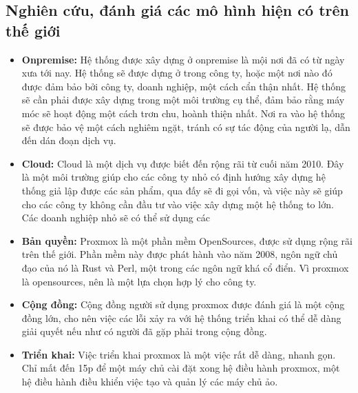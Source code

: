 \documentclass[12pt,a4paper]{report}
\begin{document}
		\subsection{Nghiên cứu, đánh giá các mô hình hiện có trên thế giới}
			\hspace{1.0cm}{Hiện nay, mô hình máy chủ trên thế giới rất phổ biến và được áp dụng vào rất nhiều các doanh nghiệp lớn và nhỏ. Tuỳ thuộc vào nhu cầu, định hướng của công ty, thì số vốn đầu tư bỏ ra vào máy chủ sẽ là khác nhau.}
			
			\hspace{0.3cm}{Hiện nay, mô hình hiện có sẽ được triển khai ở 2 nơi: }
				\begin{itemize}
					\item {\textbf{Onpremise: } Hệ thống được xây dựng ở onpremise là mội nơi đã có từ ngày xưa tới nay. Hệ thống sẽ được dựng ở trong công ty, hoặc một nơi nào đó được đảm bảo bởi công ty, doanh nghiệp, một cách cẩn thận nhất. Hệ thống sẽ cần phải được xây dựng trong một môi trường cụ thể, đảm bảo rằng máy móc sẽ hoạt động một cách trơn chu, hoành thiện nhất. Nơi ra vào hệ thống sẽ được bảo vệ một cách nghiêm ngặt, tránh có sự tác động của người lạ, dẫn đến dán đoạn dịch vụ.}
					\item {\textbf{Cloud: } Cloud là một dịch vụ được biết đến rộng rãi từ cuối năm 2010. Đây là một môi trường giúp cho các công ty nhỏ có định hướng xây dựng hệ thống giả lập được các sản phẩm, qua đấy sẽ đi gọi vốn, và việc này sẽ giúp cho các công ty không cần đầu tư vào việc xây dựng một hệ thống to lớn. Các doanh nghiệp nhỏ sẽ có thể sử dụng các }
				\end{itemize}
			\hspace{0.3cm}{Đối với định hướng từ đầu của công ty và tài sản được cấp, em sẽ triển khai hệ thống tại onpremise. Để triển khai hệ thống máy ảo, hiện tại có rất nhiều mô hình đã và đang được triển khai trên thế giới, như là VSPhere, Proxmox,... Mỗi một mô hình, đều có các ưu nhược điểm khác nhau. Với định hướng của công ty, Proxmox sẽ  là một công cụ phù hợp vì đáp ứng được các tiêu chí sau: }
				\begin{itemize}
					\item {\textbf{Bản quyền: } Proxmox là một phần mềm OpenSources, được sử dụng rộng rãi trên thế giới. Phần mềm này được phát hành vào năm 2008, ngôn ngữ chủ đạo của nó là Rust và Perl, một trong các ngôn ngữ khá cổ điển. Vì proxmox là opensources, nên là một lựa chọn hợp lý cho công ty.}
					\item {\textbf{Cộng đồng: } Cộng đồng người sử dụng proxmox được đánh giá là một cộng đồng lớn, cho nên việc các lỗi xảy ra với hệ thống triển khai có thể dễ dàng giải quyết nếu như có người đã gặp phải trong cộng đồng.}
					\item {\textbf{Triển khai: } Việc triển khai proxmox là một việc rất dễ dàng, nhanh gọn. Chỉ mất đến 15p để một máy chủ cài đặt xong hệ điều hành proxmox, một hệ điều hành điều khiển việc tạo và quản lý các máy chủ ảo.}
				\end{itemize}
			
\end{document}
